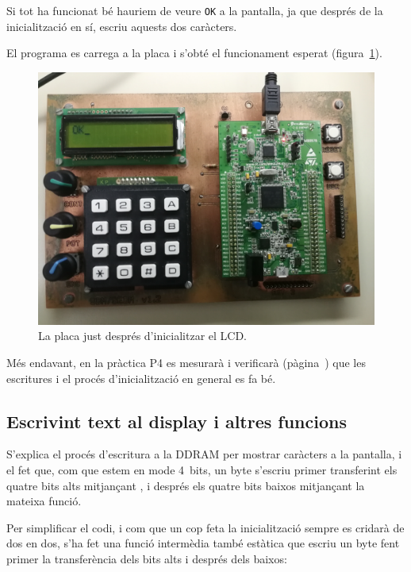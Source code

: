Si tot ha funcionat bé hauriem de veure \texttt{OK} a la pantalla, ja que després
de la inicialització en sí,  escriu aquests dos caràcters.

El programa es carrega a la placa i s'obté el funcionament esperat (figura~\ref{fig:p2-board-init}).

\begin{figure}
  \includegraphics[width=.99\columnwidth]{../photos/board/p2-init}
  \caption{ \label{fig:p2-board-init} La placa just després d'inicialitzar el LCD. }
\end{figure}

Més endavant, en la pràctica P4 es mesurarà i verificarà (pàgina~\pageref{sub:p4-lcd})
que les escritures i el procés d'inicialització en general es fa bé.


\subsection{Escrivint text al display i altres funcions}

S'explica el procés d'escritura a la DDRAM per mostrar caràcters a la pantalla,
i el fet que, com que estem en mode 4~bits, un byte s'escriu primer transferint
els quatre bits alts mitjançant , i després els quatre bits
baixos mitjançant la mateixa funció.

\voluntari
Per simplificar el codi, i com que un cop feta la inicialització 
sempre es cridarà de dos en dos, s'ha fet una funció intermèdia 
també estàtica que escriu un byte fent primer la transferència dels bits alts i
després dels baixos:

